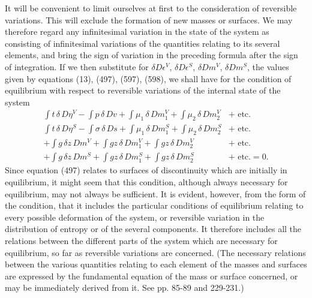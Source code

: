 \documentclass[12pt]{article}
\newcommand{\dd}{\delta}
\begin{document}
It will be convenient to limit ourselves at first to the consideration of reversible variations. This will exclude the formation of new masses or surfaces. We may therefore regard any infinitesimal variation in the state of the system as consisting of infinitesimal variations of the quantities relating to its several elements, and bring the sign of variation in the preceding formula after the sign of integration. If we then substitute for $\dd D\epsilon^V$, $\dd D\epsilon^S$, $\dd Dm^V$, $\dd Dm^S$, the values given by equations (13), (497), (597), (598), we shall have for the condition of equilibrium with respect to reversible variations of the internal state of the system
\begin{equation} \begin{aligned} \int t \, \dd \, D\eta^V - \int p \, \dd \, Dv+\int \mu_1 \,\dd\,Dm_1^V +\int \mu_2 \,\dd\,Dm_2^V &+\text{ etc.} \\
\int t \, \dd \, D\eta^S - \int \sigma \, \dd \, Ds+\int \mu_1 \,\dd\,Dm_1^S +\int \mu_2 \,\dd\,Dm_2^S &+ \text{ etc.} \\
+\int g \, \dd z \, Dm^V + \int gz \, \dd \, Dm_1^V +\int gz \, \dd \, Dm_2^V &+\text{ etc.}\\ 
+\int g \, \dd z \, Dm^S + \int gz \, \dd \, Dm_1^S +\int gz \, \dd \, Dm_2^S &+ \text{ etc.} =0.  \label{600} \end{aligned} \end{equation}
Since equation (497) relates to surfaces of discontinuity which are initially in equilibrium, it might seem that this condition, although always necessary for equilibrium, may not always be sufficient. It is evident, however, from the form of the condition, that it includes the particular conditions of equilibrium relating to every possible deformation of the system, or reversible variation in the distribution of entropy or of the several components. It therefore includes all the relations between the different parts of the system which are necessary for equilibrium, so far as reversible variations are concerned. (The necessary relations between the various quantities relating to each element of the masses and surfaces are expressed by the fundamental equation of the mass or surface concerned, or may be immediately derived from it. See pp. 85-89 and 229-231.)
\end{document}
